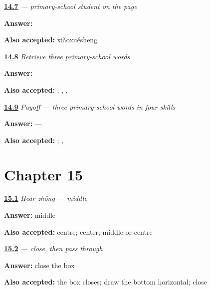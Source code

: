 \noindent\begin{minipage}[t]{\linewidth}
\raggedright
\hyperlink{review-ZH-C14-xiaoxuesheng-write}{\textbf{14.7}} \emph{ — primary-school student on the page}\par
\small \textbf{Answer:} \par
\footnotesize \textbf{Also accepted:}  xiǎoxuésheng
\end{minipage}\par\medskip

\noindent\begin{minipage}[t]{\linewidth}
\raggedright
\hyperlink{review-ZH-R14-primary-three-recall}{\textbf{14.8}} \emph{Retrieve three primary-school words}\par
\small \textbf{Answer:}  —  — \par
\footnotesize \textbf{Also accepted:}   ; , , 
\end{minipage}\par\medskip

\noindent\begin{minipage}[t]{\linewidth}
\raggedright
\hyperlink{review-ZH-C14-practice-primary-payoff}{\textbf{14.9}} \emph{Payoff — three primary-school words in four skills}\par
\small \textbf{Answer:}  — \par
\footnotesize \textbf{Also accepted:}  ; , 
\end{minipage}\par\medskip

\section*{Chapter 15}

\noindent\begin{minipage}[t]{\linewidth}
\raggedright
\hyperlink{review-ZH-C15-hear-zhong-meaning}{\textbf{15.1}} \emph{Hear \emph{zhōng} — middle}\par
\small \textbf{Answer:} middle\par
\footnotesize \textbf{Also accepted:} centre; center; middle or centre
\end{minipage}\par\medskip

\noindent\begin{minipage}[t]{\linewidth}
\raggedright
\hyperlink{review-ZH-W15-zhong-order}{\textbf{15.2}} \emph{ — close, then pass through}\par
\small \textbf{Answer:} close the box\par
\footnotesize \textbf{Also accepted:} the box closes; draw the bottom horizontal; close 
\end{minipage}\par\medskip

